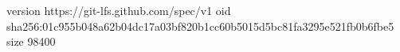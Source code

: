 version https://git-lfs.github.com/spec/v1
oid sha256:01c955b048a62b04dc17a03bf820b1cc60b5015d5bc81fa3295e521fb0b6fbe5
size 98400
